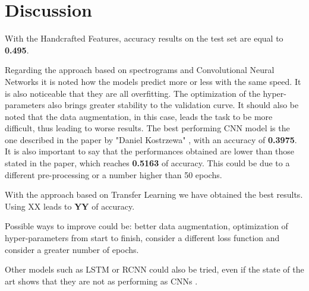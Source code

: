 \section{Discussion}

With the Handcrafted Features, accuracy results on the test set are equal to \textbf{0.495}.

Regarding the approach based on spectrograms and Convolutional Neural Networks it is noted how the models predict more or less with the same speed. It is also noticeable that they are all overfitting.
The optimization of the hyper-parameters also brings greater stability to the validation curve.
It should also be noted that the data augmentation, in this case, leads the task to be more difficult, thus leading to worse results.
The best performing CNN model is the one described in the paper by "Daniel Kostrzewa" \cite{kostrzewa2021music}, with an accuracy of \textbf{0.3975}. It is also important to say that the performances obtained are lower than those stated in the paper, which reaches \textbf{0.5163} of accuracy. This could be due to a different pre-processing or a number higher than 50 epochs.

With the approach based on Transfer Learning we have obtained the best results. Using XX leads to \textbf{YY} of accuracy.

Possible ways to improve could be: better data augmentation, optimization of hyper-parameters from start to finish, consider a different loss function and consider a greater number of epochs.

Other models such as LSTM or RCNN could also be tried, even if the state of the art shows that they are not as performing as CNNs \cite{kostrzewa2021music}.






